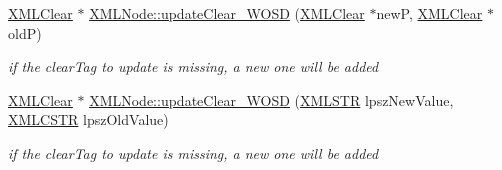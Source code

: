 \begin{DoxyCompactItemize}
\hyperlink{structXMLClear}{X\-M\-L\-Clear} $\ast$ \hyperlink{group__xmlWOSD_ga4863cd3e05ad9fac028321fffe8433b9}{X\-M\-L\-Node\-::update\-Clear\-\_\-\-W\-O\-S\-D} (\hyperlink{structXMLClear}{X\-M\-L\-Clear} $\ast$new\-P, \hyperlink{structXMLClear}{X\-M\-L\-Clear} $\ast$old\-P)
\begin{DoxyCompactList}\small\item\em if the clear\-Tag to update is missing, a new one will be added \end{DoxyCompactList}\item 
\hyperlink{structXMLClear}{X\-M\-L\-Clear} $\ast$ \hyperlink{group__xmlWOSD_gafd4fd40229c3c4ff67f019882f213cd4}{X\-M\-L\-Node\-::update\-Clear\-\_\-\-W\-O\-S\-D} (\hyperlink{xmlParser_8h_a849d96105aa0c8f64b5c10d9151a3cdc}{X\-M\-L\-S\-T\-R} lpsz\-New\-Value, \hyperlink{xmlParser_8h_acdb0d6fd8dd596384b438d86cfb2b182}{X\-M\-L\-C\-S\-T\-R} lpsz\-Old\-Value)
\begin{DoxyCompactList}\small\item\em if the clear\-Tag to update is missing, a new one will be added \end{DoxyCompactList}\end{DoxyCompactItemize}


